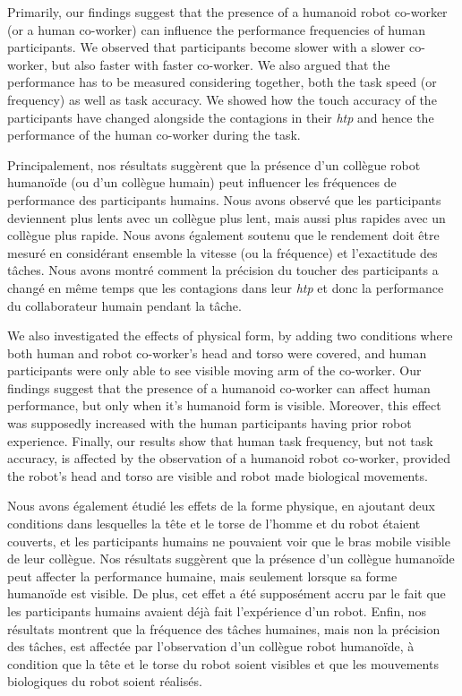 Primarily, our findings suggest that the presence of a humanoid robot co-worker (or a human co-worker) can influence the performance frequencies of human participants. We observed that participants become slower with a slower co-worker, but also faster with faster co-worker. We also argued that the performance has to be measured considering together, both the task speed (or frequency) as well as task accuracy. We showed how the touch accuracy of the participants have changed alongside the contagions in their {\it htp} and hence the performance of the human co-worker during the task.
 
Principalement, nos résultats suggèrent que la présence d'un collègue robot humanoïde (ou d'un collègue humain) peut influencer les fréquences de performance des participants humains. Nous avons observé que les participants deviennent plus lents avec un collègue plus lent, mais aussi plus rapides avec un collègue plus rapide. Nous avons également soutenu que le rendement doit être mesuré en considérant ensemble la vitesse (ou la fréquence) et l'exactitude des tâches. Nous avons montré comment la précision du toucher des participants a changé en même temps que les contagions dans leur {\it htp} et donc la performance du collaborateur humain pendant la tâche.




We also investigated the effects of physical form, by adding two conditions where both human and robot co-worker's head and torso were covered, and human participants were only able to see visible moving arm of the co-worker. Our findings suggest that the presence of a humanoid co-worker can affect human performance, but only when it's humanoid form is visible. Moreover, this effect was supposedly increased with the human participants having prior robot experience. Finally, our results show that human task frequency, but not task accuracy, is affected by the observation of a humanoid robot co-worker, provided the robot's head and torso are visible and robot made biological movements.

Nous avons également étudié les effets de la forme physique, en ajoutant deux conditions dans lesquelles la tête et le torse de l'homme et du robot étaient couverts, et les participants humains ne pouvaient voir que le bras mobile visible de leur collègue. Nos résultats suggèrent que la présence d'un collègue humanoïde peut affecter la performance humaine, mais seulement lorsque sa forme humanoïde est visible. De plus, cet effet a été supposément accru par le fait que les participants humains avaient déjà fait l'expérience d'un robot. Enfin, nos résultats montrent que la fréquence des tâches humaines, mais non la précision des tâches, est affectée par l'observation d'un collègue robot humanoïde, à condition que la tête et le torse du robot soient visibles et que les mouvements biologiques du robot soient réalisés.

